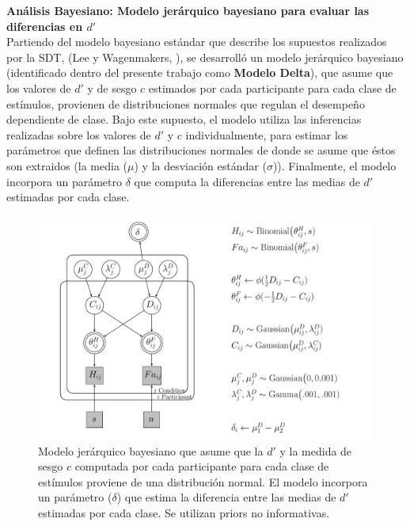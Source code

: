 \textbf{Análisis Bayesiano: Modelo jerárquico bayesiano para evaluar las diferencias en $d'$}\\

Partiendo del modelo bayesiano estándar que describe los supuestos realizados por la SDT, (Lee y Wagenmakers, \citeyear{LeeBook}), se desarrolló un modelo jerárquico bayesiano (identificado dentro del presente trabajo como \textbf{Modelo Delta}), que asume que los valores de $d'$ y de sesgo $c$ estimados por cada participante para cada clase de estímulos, provienen de distribuciones normales que regulan el desempeño dependiente de clase. Bajo este supuesto, el modelo utiliza las inferencias realizadas sobre los valores de $d'$ y $c$ individualmente, para estimar los parámetros que definen las distribuciones normales de donde se asume que éstos son extraidos (la media ($\mu$) y la desviación estándar ($\sigma$)). Finalmente, el modelo incorpora un parámetro $\delta$ que computa la diferencias entre las medias de $d'$ estimadas por cada clase.\\

\begin{figure}[h]
\centering
\includegraphics[width=1\textwidth]{Figures/Model_Delta_Diff_D}
\decoRule
\caption[Modelo Delta: Modelo jerárquico bayesiano para evaluar las diferencias entre las medias de $d'$ de cada clase de estímulo]{Modelo jerárquico bayesiano que asume que la $d'$ y la medida de sesgo $c$ computada por cada participante para cada clase de estímulos proviene de una distribución normal. El modelo incorpora un parámetro ($\delta$) que estima la diferencia entre las medias de $d'$ estimadas por cada clase. Se utilizan priors no informativas.}
\label{fig:Mod_Delta}
\end{figure}

